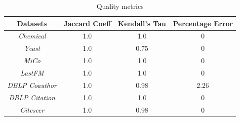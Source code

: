 \begin{table}[tb!]
	\vspace{5mm}
	\begin{center}
		\vspace{-1mm}
		\centering
		\caption{Quality metrics\label{tab:quality}}
		\vspace{-3mm}
		\begin{tabular} {cccc}
			\hline
			Datasets  & Jaccard Coeff & Kendall's Tau  & Percentage Error\\			 
			\hline 
			{\em Chemical}   &   1.0   &  1.0   & 0\\
			{\em Yeast}   &   1.0    &  0.75  & 0\\
			{\em MiCo}   &   1.0    &  1.0   & 0\\ 
			{\em LastFM}   &  1.0   &  1.0 & 0\\
			{\em DBLP Coauthor}   &   1.0  &  0.98  & 2.26\\ 
			{\em DBLP Citation}   &   1.0   &  1.0   & 0\\
			{\em Citeseer}   &   1.0   &  0.98 & 0\\
			
			\hline
		\end{tabular}
	\end{center}
	\vspace{-4mm}
\end{table}






